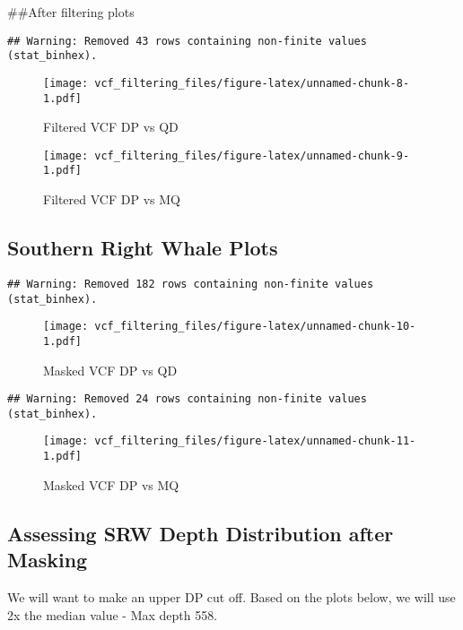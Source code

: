 \documentclass[
]{article}
\begin{document}
\#\#After filtering plots

\begin{verbatim}
## Warning: Removed 43 rows containing non-finite values (stat_binhex).
\end{verbatim}

\begin{figure}
\centering
\texttt{[image: vcf\_filtering\_files/figure-latex/unnamed-chunk-8-1.pdf]}
\caption{Filtered VCF DP vs QD}
\end{figure}

\begin{figure}
\centering
\texttt{[image: vcf\_filtering\_files/figure-latex/unnamed-chunk-9-1.pdf]}
\caption{Filtered VCF DP vs MQ}
\end{figure}

\hypertarget{southern-right-whale-plots}{%
\subsection{Southern Right Whale
Plots}\label{southern-right-whale-plots}}

\begin{verbatim}
## Warning: Removed 182 rows containing non-finite values (stat_binhex).
\end{verbatim}

\begin{figure}
\centering
\texttt{[image: vcf\_filtering\_files/figure-latex/unnamed-chunk-10-1.pdf]}
\caption{Masked VCF DP vs QD}
\end{figure}

\begin{verbatim}
## Warning: Removed 24 rows containing non-finite values (stat_binhex).
\end{verbatim}

\begin{figure}
\centering
\texttt{[image: vcf\_filtering\_files/figure-latex/unnamed-chunk-11-1.pdf]}
\caption{Masked VCF DP vs MQ}
\end{figure}

\hypertarget{assessing-srw-depth-distribution-after-masking}{%
\subsection{Assessing SRW Depth Distribution after
Masking}\label{assessing-srw-depth-distribution-after-masking}}

We will want to make an upper DP cut off. Based on the plots below, we
will use 2x the median value - Max depth 558.
\end{document}
